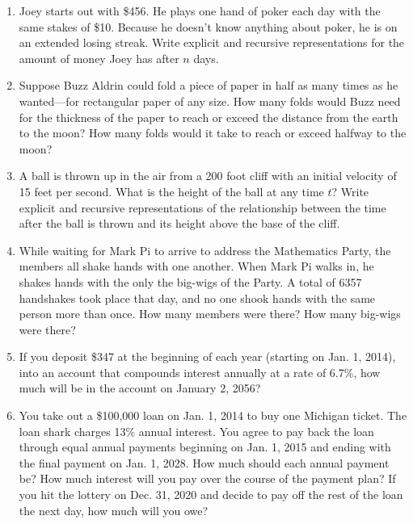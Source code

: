 \newpage
\begin{problems}
\begin{enumerate}

\item Joey starts out with \$456.  He plays one hand of poker each day with the same stakes of \$10.  Because he doesn't know anything about poker, he is on an extended losing streak.  Write explicit and recursive representations for the amount of money Joey has after $n$ days.  
      
\item Suppose Buzz Aldrin could fold a piece of paper in half as many times as he wanted---for rectangular paper of any size.  How many folds would Buzz need for the thickness of the paper to reach or exceed the distance from the earth to the moon?  How many folds would it take to reach or exceed halfway to the moon?

\item A ball is thrown up in the air from a 200 foot cliff with an initial velocity of 15 feet per second.  What is the height of the ball at any time $t$?  Write explicit and recursive representations of the relationship between the time after the ball is thrown and its height above the base of the cliff.

\item While waiting for Mark Pi to arrive to address the Mathematics Party, the members all shake hands with one another.  When Mark Pi walks in, he shakes hands with the only the big-wigs of the Party.  A total of 6357 handshakes took place that day, and no one shook hands with the same person more than once.  How many members were there?  How many big-wigs were there?

\item If you deposit \$347 at the beginning of each year (starting on Jan. 1, 2014), into an account that compounds interest annually at a rate of 6.7\%, how much will be in the account on January 2, 2056?

\item You take out a \$100,000 loan on Jan. 1, 2014 to buy one Michigan ticket.  The loan shark charges 13\% annual interest.  You agree to pay back the loan through equal annual payments beginning on Jan. 1, 2015 and ending with the final payment on Jan. 1, 2028.  How much should each annual payment be? How much interest will you pay over the course of the payment plan?  If you hit the lottery on Dec. 31, 2020 and decide to pay off the rest of the loan the next day, how much will you owe?


\end{enumerate}
\end{problems}
